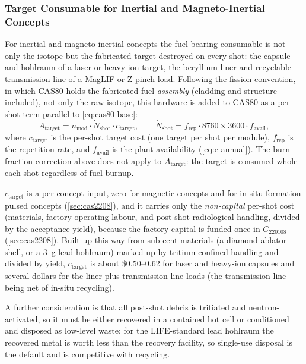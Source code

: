 \documentclass{article}
\begin{document}
\subsubsection{Target Consumable for Inertial and Magneto-Inertial Concepts}
\label{sec:cas80-target}
For inertial and magneto-inertial concepts the fuel-bearing consumable
is not only the isotope but the fabricated target destroyed on every
shot: the capsule and hohlraum of a laser or heavy-ion target, the
beryllium liner and recyclable transmission line of a MagLIF or Z-pinch
load. Following the fission convention, in which CAS80 holds the
fabricated fuel \emph{assembly} (cladding and structure included), not
only the raw isotope, this hardware is added to CAS80 as a per-shot
term parallel to \cref{eq:cas80-base}:
\begin{equation}
\label{eq:cas80-target}
A_{\text{target}} = n_{\text{mod}} \cdot \dot{N}_{\text{shot}} \cdot c_{\text{target}},
\qquad
\dot{N}_{\text{shot}} = f_{\text{rep}} \cdot 8760 \times 3600 \cdot f_{\text{avail}},
\end{equation}
where $c_{\text{target}}$ is the per-shot target cost (one target per
shot per module), $f_{\text{rep}}$ is the repetition rate, and
$f_{\text{avail}}$ is the plant availability (\cref{eq:e-annual}). The
burn-fraction correction above does not apply to $A_{\text{target}}$:
the target is consumed whole each shot regardless of fuel burnup.

$c_{\text{target}}$ is a per-concept input, zero for magnetic concepts
and for in-situ-formation pulsed concepts (\cref{sec:cas2208}),
and it carries only the \emph{non-capital} per-shot cost (materials,
factory operating labour, and post-shot radiological handling, divided
by the acceptance yield), because the factory capital is funded once in
$C_{220108}$ (\cref{sec:cas2208}). Built up this way from sub-cent
materials (a diamond ablator shell, or a 3~g lead hohlraum) marked up by
tritium-confined handling and divided by yield, $c_{\text{target}}$ is
about \$0.50--0.62 for laser and heavy-ion capsules and several dollars
for the liner-plus-transmission-line loads (the transmission line being
net of in-situ recycling).

A further consideration is that all
post-shot debris is tritiated and neutron-activated, so it must be either
recovered in a contained hot cell or conditioned and disposed as
low-level waste; for the LIFE-standard lead hohlraum the recovered metal
is worth less than the recovery facility, so single-use disposal is the
default and is competitive with recycling.
\end{document}
